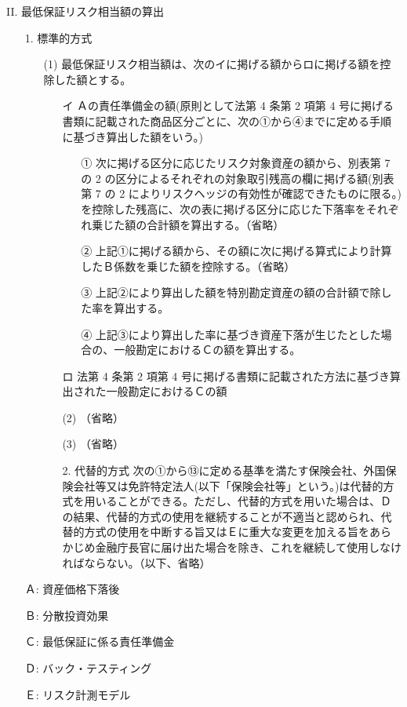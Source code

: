 \documentclass[report,gutter=10mm,fore-edge=10mm,uplatex,dvipdfmx]{jlreq}
\begin{document}
II. 最低保証リスク相当額の算出
\begin{itemize}
\item[1.] 標準的方式
\begin{itemize}
\item[(1)]最低保証リスク相当額は、次のイに掲げる額からロに掲げる額を控除した額とする。
\begin{itemize}
\item[イ]Ａの責任準備金の額(原則として法第 4 条第 2 項第 4 号に掲げる書類に記載された商品区分ごとに、次の①から④までに定める手順に基づき算出した額をいう。)
\begin{itemize}
\item[①] 次に掲げる区分に応じたリスク対象資産の額から、別表第 7 の 2 の区分によるそれぞれの対象取引残高の欄に掲げる額(別表第 7 の 2 によりリスクヘッジの有効性が確認できたものに限る。)を控除した残高に、次の表に掲げる区分に応じた下落率をそれぞれ乗じた額の合計額を算出する。（省略）
\item[②] 上記①に掲げる額から、その額に次に掲げる算式により計算したＢ係数を乗じた額を控除する。（省略）
\item[③] 上記②により算出した額を特別勘定資産の額の合計額で除した率を算出する。
\item[④] 上記③により算出した率に基づき資産下落が生じたとした場合の、一般勘定におけるＣの額を算出する。
\end{itemize}
\item[ロ] 法第 4 条第 2 項第 4 号に掲げる書類に記載された方法に基づき算出された一般勘定におけるＣの額
\item[(2)] （省略）
\item[(3)] （省略）
\item[2.] 代替的方式
次の①から⑬に定める基準を満たす保険会社、外国保険会社等又は免許特定法人(以下「保険会社等」という。)は代替的方式を用いることができる。ただし、代替的方式を用いた場合は、Ｄの結果、代替的方式の使用を継続することが不適当と認められ、代替的方式の使用を中断する旨又はＥに重大な変更を加える旨をあらかじめ金融庁長官に届け出た場合を除き、これを継続して使用しなければならない。（以下、省略）
\end{itemize}
\end{itemize}
\end{itemize}
\answer{}
\begin{itemize}
\item[ Ａ: ] 資産価格下落後
\item[ Ｂ: ] 分散投資効果
\item[ Ｃ: ] 最低保証に係る責任準備金
\item[ Ｄ: ] バック・テスティング
\item[ Ｅ: ] リスク計測モデル
\end{itemize}
\end{document}
